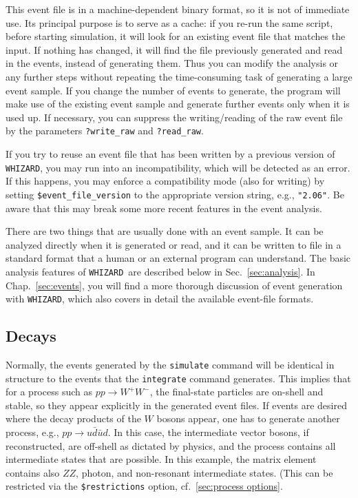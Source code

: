 \documentclass[12pt]{book}
\newcommand{\ttt}[1]{\texttt{#1}}
\newcommand{\whizard}{\texttt{WHIZARD}}
\begin{document}
This event file is in a machine-dependent binary format, so it is not of
immediate use.  Its principal purpose is to serve as a cache: if you re-run
the same script, before starting simulation, it will look for an existing
event file that matches the input.  If nothing has changed, it will find the
file previously generated and read in the events, instead of generating them.
Thus you can modify the analysis or any further steps without repeating the
time-consuming task of generating a large event sample.  If you change the
number of events to generate, the program will make use of the existing event
sample and generate further events only when it is used up.  If necessary, you
can suppress the writing/reading of the raw event file by the parameters
\verb|?write_raw| and \verb|?read_raw|.

If you try to reuse an event file that has been written by a previous version
of \whizard, you may run into an incompatibility, which will be detected as an
error.  If this happens, you may enforce a compatibility mode (also for
writing) by setting \ttt{\$event\_file\_version} to the appropriate version
string, e.g., \verb|"2.06"|.  Be aware that this may break some more recent
features in the event analysis.

There are two things that are usually done with an event sample.  It can be
analyzed directly when it is generated or read, and it can be written to file
in a standard format that a human or an external program can understand.  The
basic analysis features of \whizard\ are described below in
Sec.~\ref{sec:analysis}.  In Chap.~\ref{sec:events}, you will find a more
thorough discussion of event generation with \whizard, which also covers in
detail the available event-file formats.


\subsection{Decays}

Normally, the events generated by the \ttt{simulate} command will be identical
in structure to the events that the \ttt{integrate} command generates.  This
implies that for a process such as $pp\to W^+W^-$, the final-state particles
are on-shell and stable, so they appear explicitly in the generated event
files.  If events are desired where the decay products of the $W$ bosons
appear, one has to generate another process, e.g., $pp\to u\bar d\bar ud$.  In
this case, the intermediate vector bosons, if reconstructed, are off-shell as
dictated by physics, and the process contains all intermediate states that are
possible.  In this example, the matrix element contains also $ZZ$, photon, and
non-resonant intermediate states.  (This can be restricted via the
\verb|$restrictions| option, cf.\ \ref{sec:process options}.
\end{document}
